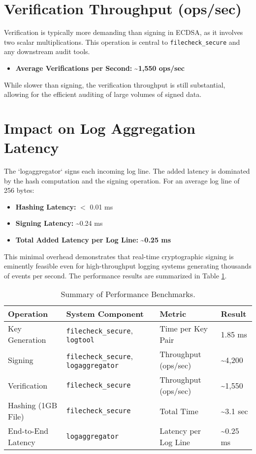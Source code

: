 \section{Verification Throughput (ops/sec)}
Verification is typically more demanding than signing in ECDSA, as it involves two scalar multiplications. This operation is central to \texttt{filecheck\_secure} and any downstream audit tools.
\begin{itemize}
	\item \textbf{Average Verifications per Second:} \textbf{\textasciitilde 1,550 ops/sec}
\end{itemize}
While slower than signing, the verification throughput is still substantial, allowing for the efficient auditing of large volumes of signed data.

\section{Impact on Log Aggregation Latency}
The `logaggregator` signs each incoming log line. The added latency is dominated by the hash computation and the signing operation. For an average log line of 256 bytes:
\begin{itemize}
	\item \textbf{Hashing Latency:} $<$ 0.01 ms
	\item \textbf{Signing Latency:} \textasciitilde 0.24 ms
	\item \textbf{Total Added Latency per Log Line:} \textbf{\textasciitilde 0.25 ms}
\end{itemize}
This minimal overhead demonstrates that real-time cryptographic signing is eminently feasible even for high-throughput logging systems generating thousands of events per second. The performance results are summarized in Table \ref{tab:perf_summary}.

\begin{table}[h!]
	\centering
	\caption{Summary of Performance Benchmarks.}
	\label{tab:perf_summary}
	\begin{tabular}{|l|l|l|l|}
		\hline
		\textbf{Operation} & \textbf{System Component} & \textbf{Metric} & \textbf{Result} \\ \hline \hline
		Key Generation & \texttt{filecheck\_secure}, \texttt{logtool} & Time per Key Pair & 1.85 ms \\ \hline
		Signing & \texttt{filecheck\_secure}, \texttt{logaggregator} & Throughput (ops/sec) & \textasciitilde 4,200 \\ \hline
		Verification & \texttt{filecheck\_secure} & Throughput (ops/sec) & \textasciitilde 1,550 \\ \hline
		Hashing (1GB File) & \texttt{filecheck\_secure} & Total Time & \textasciitilde 3.1 sec \\ \hline
		End-to-End Latency & \texttt{logaggregator} & Latency per Log Line & \textasciitilde 0.25 ms \\ \hline
	\end{tabular}
\end{table}


